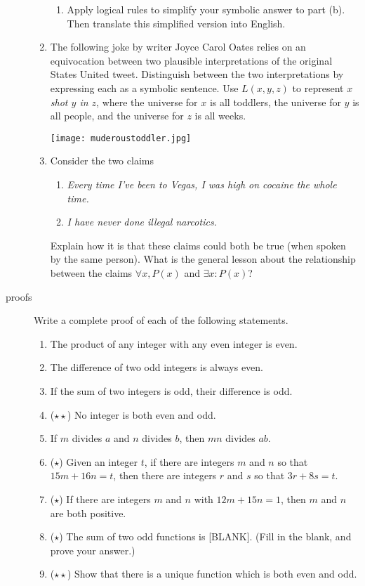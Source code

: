 \documentclass{letter}
\theoremstyle{definition}
\begin{document}
\begin{description}
\begin{enumerate}
\begin{enumerate}
				\item Apply logical rules to simplify your symbolic answer to part (b). Then translate this simplified version into English.
			\end{enumerate}
		\item The following joke by writer Joyce Carol Oates relies on an equivocation between two plausible interpretations of the original States United tweet. Distinguish between the two interpretations by expressing each as a symbolic sentence. Use $L(x,y,z)$ to represent {\em $x$ shot $y$ in $z$}, where the universe for $x$ is all toddlers, the universe for $y$ is all people, and the universe for $z$ is all weeks.
		
			\begin{center}\texttt{[image: muderoustoddler.jpg]}  \end{center}
		\item Consider the two claims
			\begin{enumerate}[(1)]
				\item {\em Every time I've been to Vegas, I was high on cocaine the whole time.}
				\item {\em I have never done illegal narcotics.}
			\end{enumerate}
			Explain how it is that these claims could both be true (when spoken by the same person). What is the general lesson about the relationship between the claims $\forall x, P(x)$ and $\exists x: P(x)$?
\end{enumerate}
\item[proofs] Write a complete proof of each of the following statements.
	\begin{enumerate}
		\item The product of any integer with any even integer is even.
		\item The difference of two odd integers is always even.
		\item If the sum of two integers is odd, their difference is odd.
		\item ($\star \star$) No integer is both even and odd.
		\item If $m$ divides $a$ and $n$ divides $b$, then $mn$ divides $ab$.
		\item ($\star$)  Given an integer $t$, if there are integers $m$ and $n$ so that $15m+16n=t$, then there are integers $r$ and $s$ so that $3r+8s=t$.
		\item ($\star$) If there are integers $m$ and $n$ with $12m+15n=1$, then $m$ and $n$ are both positive. 
		\item ($\star$) The sum of two odd functions is [BLANK]. (Fill in the blank, and prove your answer.)
		\item ($\star \star$) Show that there is a unique function which is both even and odd.
\end{enumerate}
\end{description}
\end{document}
